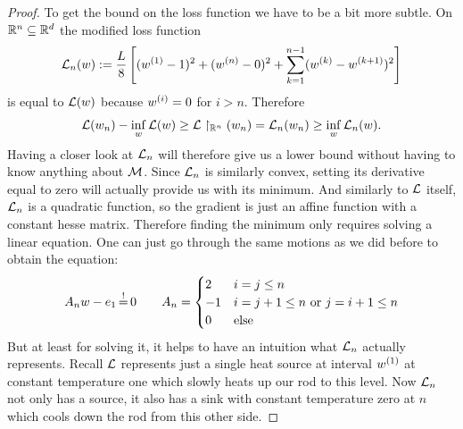 \begin{proof}
	To get the bound on the loss function we have to be a bit more subtle.
	On \(\mathbb{R}^n\subseteq \mathbb{R}^d\) the modified loss function
	\begin{align}\label{eq: sink loss}
		\mathcal{L}_n(w) := \frac{L}{8}\left[
			(w^{(1)} -1)^2
			+ (w^{(n)} - 0)^2
			+ \sum_{k=1}^{n-1} (w^{(k)} - w^{(k+1)})^2
		\right]
	\end{align}
	is equal to \(\mathcal{L}(w)\) because \(w^{(i)}=0\) for \(i>n\).
	Therefore
	\begin{align*}
		\mathcal{L}(w_n) - \inf_{w}\mathcal{L}(w)
		\ge \mathcal{L}\restriction_{\mathbb{R}^n}(w_n) = \mathcal{L}_n(w_n)
		\ge \inf_{w}\mathcal{L}_n(w).
	\end{align*}
	Having a closer look at \(\mathcal{L}_n\) will therefore give us a lower bound
	without having to know anything about \(\mathcal{M}\). Since \(\mathcal{L}_n\)
	is similarly convex, setting its derivative equal to zero will actually provide us
	with its minimum. And similarly to \(\mathcal{L}\) itself, \(\mathcal{L}_n\) is a
	quadratic function, so the gradient is just an affine function with a
	constant hesse matrix. Therefore finding the minimum only requires solving
	a linear equation. One can just go through the same motions as we did
	before to obtain the equation:
	\begin{align}\label{eq: optimality condition for sink loss}
		A_n \weights - \stdBasis_1 \xeq{!} 0 \qquad 
		A_n =\begin{cases}
			2 & i=j\le n \\
			-1 & i=j+1\le n \text{ or } j=i+1\le n \\
			0 & \text{else}
		\end{cases} 
	\end{align}
	But at least for solving it, it helps to have an intuition what \(\mathcal{L}_n\)
	actually represents. Recall \(\mathcal{L}\) represents just
	a single heat source at interval \(w^{(1)}\) at constant
	temperature one which slowly heats up our rod to this level. Now
	\(\mathcal{L}_n\) not only has a source, it also has a sink with constant
	temperature zero at \(n\) which cools down the rod from this other side.


\end{proof}
